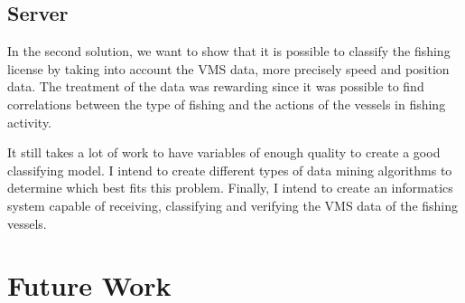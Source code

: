 
\subsection{Server} %
\label{sub:server}
In the second solution, we want to show that it is possible to classify the fishing license by taking into account the VMS data, more precisely speed and position data.
The treatment of the data was rewarding since it was possible to find correlations between the type of fishing and the actions of the vessels in fishing activity.

It still takes a lot of work to have variables of enough quality to create a good classifying model.
I intend to create different types of data mining algorithms to determine which best fits this problem.
Finally, I intend to create an informatics system capable of receiving, classifying and verifying the VMS data of the fishing vessels.


\section{Future Work} %
\label{sub:future_work}






